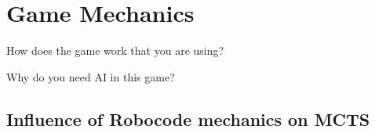 \section{Game Mechanics}
\label{03}
How does the game work that you are using? 

Why do you need AI in this game?


\subsection{Influence of Robocode mechanics on MCTS}
\label{03_01}
